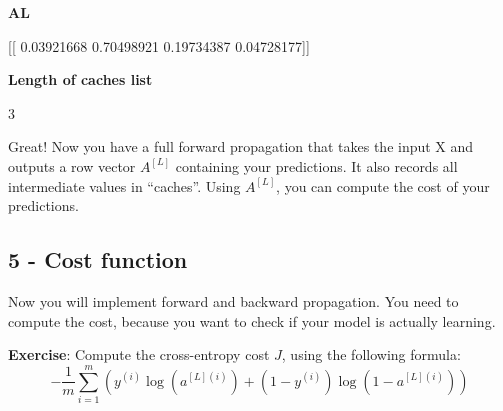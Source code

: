 \documentclass[11pt]{article}
\begin{document}
    \textbf{AL}

{[}{[} 0.03921668 0.70498921 0.19734387 0.04728177{]}{]}

\textbf{Length of caches list }

3

    Great! Now you have a full forward propagation that takes the input X
and outputs a row vector $A^{[L]}$ containing your predictions. It also
records all intermediate values in ``caches''. Using $A^{[L]}$, you can
compute the cost of your predictions.

    \subsection{5 - Cost function}\label{cost-function}

Now you will implement forward and backward propagation. You need to
compute the cost, because you want to check if your model is actually
learning.

\textbf{Exercise}: Compute the cross-entropy cost $J$, using the
following formula:
\[-\frac{1}{m} \sum\limits_{i = 1}^{m} (y^{(i)}\log\left(a^{[L] (i)}\right) + (1-y^{(i)})\log\left(1- a^{[L](i)}\right)) \tag{7}\]
\end{document}
